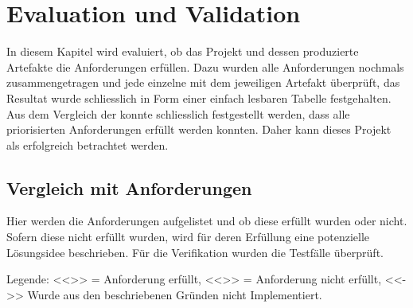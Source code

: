 \chapter{Evaluation und Validation}
\label{ch:Eval}
In diesem Kapitel wird evaluiert, ob das Projekt und dessen produzierte Artefakte die Anforderungen erfüllen. Dazu wurden alle Anforderungen nochmals zusammengetragen und jede einzelne mit dem jeweiligen Artefakt überprüft, das Resultat wurde schliesslich in Form einer einfach lesbaren Tabelle festgehalten. Aus dem Vergleich der konnte schliesslich festgestellt werden, dass alle priorisierten Anforderungen erfüllt werden konnten. Daher kann dieses Projekt als erfolgreich betrachtet werden.

\section{Vergleich mit Anforderungen}
\label{sec:VergleichAnforderungen}
Hier werden die Anforderungen aufgelistet und ob diese erfüllt wurden oder nicht. Sofern diese nicht erfüllt wurden, wird für deren Erfüllung eine potenzielle Lösungsidee beschrieben. Für die Verifikation wurden die Testfälle überprüft.

Legende:
<<\checkmark >> = Anforderung erfüllt, <<\xmark>> = Anforderung nicht erfüllt, <<->> Wurde aus den beschriebenen Gründen nicht Implementiert.


